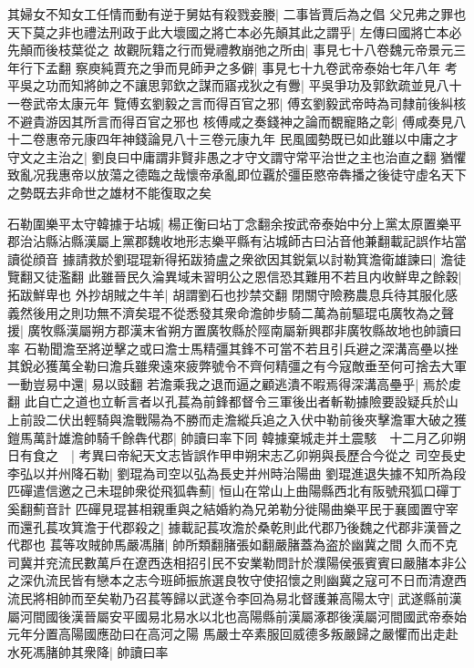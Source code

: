 其婦女不知女工任情而動有逆于舅姑有殺戮妾媵|{
	二事皆賈后為之倡}
父兄弗之罪也天下莫之非也禮法刑政于此大壞國之將亡本必先顛其此之謂乎|{
	左傳曰國將亡本必先顛而後枝葉從之}
故觀阮籍之行而覺禮教崩弛之所由|{
	事見七十八卷魏元帝景元三年行下孟翻}
察庾純賈充之爭而見師尹之多僻|{
	事見七十九卷武帝泰始七年八年}
考平吳之功而知將帥之不讓思郭欽之謀而寤戎狄之有釁|{
	平吳爭功及郭欽疏並見八十一卷武帝太康元年}
覽傅玄劉毅之言而得百官之邪|{
	傅玄劉毅武帝時為司隸前後糾核不避貴游因其所言而得百官之邪也}
核傅咸之奏錢神之論而覩寵賂之彰|{
	傅咸奏見八十二卷惠帝元康四年神錢論見八十三卷元康九年}
民風國勢既已如此雖以中庸之才守文之主治之|{
	劉良曰中庸謂非賢非愚之才守文謂守常平治世之主也治直之翻}
猶懼致亂况我惠帝以放蕩之德臨之哉懷帝承亂即位覊於彊臣愍帝犇播之後徒守虛名天下之勢既去非命世之雄材不能復取之矣

石勒圍樂平太守韓據于坫城|{
	楊正衡曰坫丁念翻余按武帝泰始中分上黨太原置樂平郡治沾縣沾縣漢屬上黨郡魏收地形志樂平縣有沾城師古曰沾音他兼翻載記誤作坫當讀從顔音}
據請救於劉琨琨新得拓跋猗盧之衆欲因其鋭氣以討勒箕澹衛雄諫曰|{
	澹徒覽翻又徒濫翻}
此雖晉民久淪異域未習明公之恩信恐其難用不若且内收鮮卑之餘穀|{
	拓跋鮮卑也}
外抄胡賊之牛羊|{
	胡謂劉石也抄禁交翻}
閉關守險務農息兵待其服化感義然後用之則功無不濟矣琨不從悉發其衆命澹帥步騎二萬為前驅琨屯廣牧為之聲援|{
	廣牧縣漢屬朔方郡漢末省朔方置廣牧縣於陘南屬新興郡非廣牧縣故地也帥讀曰率}
石勒聞澹至將逆擊之或曰澹士馬精彊其鋒不可當不若且引兵避之深溝高壘以挫其銳必獲萬全勒曰澹兵雖衆遠來疲弊號令不齊何精彊之有今寇敵垂至何可捨去大軍一動豈易中還|{
	易以豉翻}
若澹乘我之退而逼之顧逃潰不暇焉得深溝高壘乎|{
	焉於䖍翻}
此自亡之道也立斬言者以孔萇為前鋒都督令三軍後出者斬勒據險要設疑兵於山上前設二伏出輕騎與澹戰陽為不勝而走澹縱兵追之入伏中勒前後夾擊澹軍大破之獲鎧馬萬計雄澹帥騎千餘犇代郡|{
	帥讀曰率下同}
韓據棄城走并土震駭　十二月乙卯朔日有食之　|{
	考異曰帝紀天文志皆誤作甲申朔宋志乙卯朔與長歷合今從之}
司空長史李弘以并州降石勒|{
	劉琨為司空以弘為長史并州時治陽曲}
劉琨進退失據不知所為段匹磾遣信邀之己未琨帥衆從飛狐犇薊|{
	恒山在常山上曲陽縣西北有阪號飛狐口磾丁奚翻薊音計}
匹磾見琨甚相親重與之結婚約為兄弟勒分徙陽曲樂平民于襄國置守宰而還孔萇攻箕澹于代郡殺之|{
	據載記萇攻澹於桑乾則此代郡乃後魏之代郡非漢晉之代郡也}
萇等攻賊帥馬嚴馮䐗|{
	帥所類翻䐗張如翻嚴䐗蓋為盗於幽冀之間}
久而不克司冀并兖流民數萬戶在遼西迭相招引民不安業勒問計於濮陽侯張賓賓曰嚴䐗本非公之深仇流民皆有戀本之志今班師振旅選良牧守使招懷之則幽冀之寇可不日而清遼西流民將相帥而至矣勒乃召萇等歸以武遂令李回為易北督護兼高陽太守|{
	武遂縣前漢屬河間國後漢晉屬安平國易北易水以北也高陽縣前漢屬涿郡後漢屬河間國武帝泰始元年分置高陽國應劭曰在高河之陽}
馬嚴士卒素服回威德多叛嚴歸之嚴懼而出走赴水死馮䐗帥其衆降|{
	帥讀曰率}
